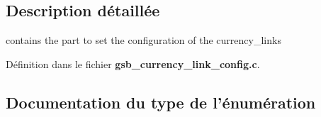 \subsection{Description détaillée}
contains the part to set the configuration of the currency\_\-links 

Définition dans le fichier {\bf gsb\_\-currency\_\-link\_\-config.c}.



\subsection{Documentation du type de l'énumération}
